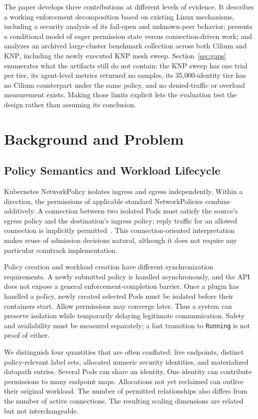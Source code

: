 \documentclass[letterpaper,twocolumn,10pt]{article}
\newcommand{\sys}{\textsc{KNP}}
\begin{document}
The paper develops three contributions at different levels of evidence.
It describes a working enforcement decomposition based on existing Linux
mechanisms, including a security analysis of its fail-open and
unknown-peer behavior; presents a conditional model of eager permission
state versus connection-driven work; and analyzes an archived
large-cluster benchmark collection across both Cilium and \sys{}, including
the newly executed \sys{} mesh sweep. Section~\ref{sec:gaps}
enumerates what the artifacts still do not contain: the \sys{} sweep has
one trial per tier, its agent-level metrics returned no samples, its
35,000-identity tier has no Cilium counterpart under the same policy, and
no denied-traffic or overload measurement exists. Making those limits
explicit lets the evaluation test the design rather than assuming its
conclusion.

\section{Background and Problem}
\label{sec:background}
\subsection{Policy Semantics and Workload Lifecycle}
Kubernetes NetworkPolicy isolates ingress and egress independently. Within
a direction, the permissions of applicable standard NetworkPolicies combine
additively. A connection between two isolated Pods must satisfy the source's
egress policy and the destination's ingress policy; reply traffic for an
allowed connection is implicitly permitted~\cite{k8snetworkpolicy}. This
connection-oriented interpretation makes reuse of admission decisions
natural, although it does not require any particular conntrack implementation.

Policy creation and workload creation have different synchronization
requirements. A newly submitted policy is handled asynchronously, and the
API does not expose a general enforcement-completion barrier. Once a plugin
has handled a policy, newly created selected Pods must be isolated before
their containers start. Allow permissions may converge later. Thus a system
can preserve isolation while temporarily delaying legitimate communication.
Safety and availability must be measured separately; a fast transition to
\texttt{Running} is not proof of either.

We distinguish four quantities that are often conflated: live endpoints,
distinct policy-relevant label sets, allocated numeric security identities,
and materialized datapath entries. Several Pods can share an identity.
One identity can contribute permissions to many endpoint maps. Allocations
not yet reclaimed can outlive their original workload. The number of
permitted relationships also differs from the number of active connections.
The resulting scaling dimensions are related but not interchangeable.
\end{document}
